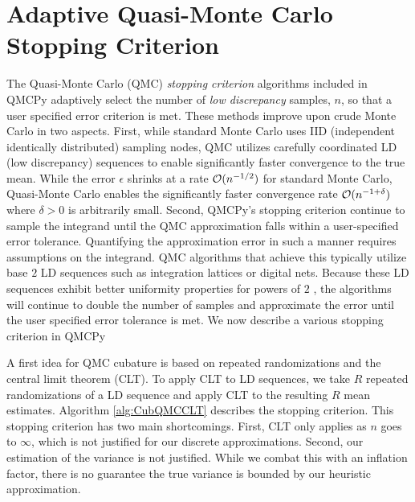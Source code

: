 \documentclass{article}
\begin{document}
\section{Adaptive Quasi-Monte Carlo Stopping Criterion}

The Quasi-Monte Carlo (QMC) \emph{stopping criterion} algorithms included in QMCPy adaptively select the number of \emph{low discrepancy} samples, $n$, so that a user specified error criterion is met. These methods improve upon crude Monte Carlo in two aspects. First, while standard Monte Carlo uses IID (independent identically distributed) sampling nodes, QMC utilizes carefully coordinated LD (low discrepancy) sequences to enable significantly faster convergence to the true mean. While the error $\epsilon$ shrinks at a rate $\mathcal{O}(n^{-1/2})$ for standard Monte Carlo, Quasi-Monte Carlo enables the significantly faster convergence rate $\mathcal{O}(n^{-1+\delta})$ where $\delta >0$ is arbitrarily small. Second, QMCPy's stopping criterion continue to sample the integrand until the QMC approximation falls within a user-specified error tolerance. Quantifying the approximation error in such a manner requires assumptions on the integrand. QMC algorithms that achieve this typically utilize base $2$ LD sequences such as integration lattices or digital nets. Because these LD sequences exhibit better uniformity properties for powers of $2$ , the algorithms will continue to double the number of samples and approximate the error until the user specified error tolerance is met. We now describe a various stopping criterion in QMCPy

A first idea for QMC cubature is based on repeated randomizations and the central limit theorem (CLT). To apply CLT to LD sequences, we take $R$ repeated randomizations of a LD sequence and apply CLT to the resulting $R$ mean estimates. Algorithm \ref{alg:CubQMCCLT} describes the  stopping criterion.
This stopping criterion has two main shortcomings. First, CLT only applies as $n$ goes to $\infty$, which is not justified for our discrete approximations. Second, our estimation of the variance is not justified. While we combat this with an inflation factor, there is no guarantee the true variance is bounded by our heuristic approximation. 
\end{document}
